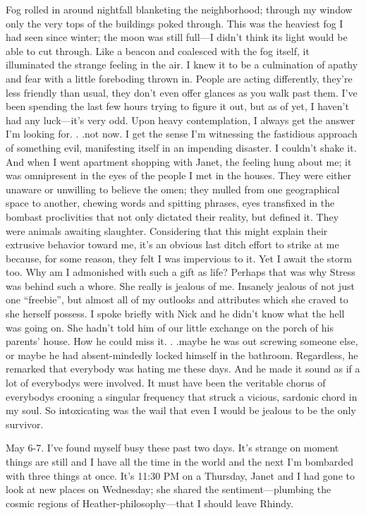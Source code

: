 Fog rolled in around nightfall blanketing the neighborhood; through my
window only the very tops of the buildings poked through. This was the
heaviest fog I had seen since winter; the moon was still full---I didn't
think its light would be able to cut through. Like a beacon and
coalesced with the fog itself, it illuminated the strange feeling in the
air. I knew it to be a culmination of apathy and fear with a little
foreboding thrown in. People are acting differently, they're less
friendly than usual, they don't even offer glances as you walk past
them. I've been spending the last few hours trying to figure it out, but
as of yet, I haven't had any luck---it's very odd. Upon heavy
contemplation, I always get the answer I'm looking for. . .not now. I
get the sense I'm witnessing the fastidious approach of something evil,
manifesting itself in an impending disaster. I couldn't shake it. And
when I went apartment shopping with Janet, the feeling hung about me; it
was omnipresent in the eyes of the people I met in the houses. They were
either unaware or unwilling to believe the omen; they mulled from one
geographical space to another, chewing words and spitting phrases, eyes
transfixed in the bombast proclivities that not only dictated their
reality, but defined it. They were animals awaiting slaughter.
Considering that this might explain their extrusive behavior toward me,
it's an obvious last ditch effort to strike at me because, for some
reason, they felt I was impervious to it. Yet I await the storm too. Why
am I admonished with such a gift as life? Perhaps that was why Stress
was behind such a whore. She really is jealous of me. Insanely jealous
of not just one ``freebie'', but almost all of my outlooks and
attributes which she craved to she herself possess. I spoke briefly with
Nick and he didn't know what the hell was going on. She hadn't told him
of our little exchange on the porch of his parents' house. How he could
miss it. . .maybe he was out screwing someone else, or maybe he had
absent-mindedly locked himself in the bathroom. Regardless, he remarked
that everybody was hating me these days. And he made it sound as if a
lot of everybodys were involved. It must have been the veritable chorus
of everybodys crooning a singular frequency that struck a vicious,
sardonic chord in my soul. So intoxicating was the wail that even I
would be jealous to be the only survivor.

May 6-7. I've found myself busy these past two days. It's strange on
moment things are still and I have all the time in the world and the
next I'm bombarded with three things at once. It's 11:30 PM on a
Thursday, Janet and I had gone to look at new places on Wednesday; she
shared the sentiment---plumbing the cosmic regions of
Heather-philosophy---that I should leave Rhindy.

